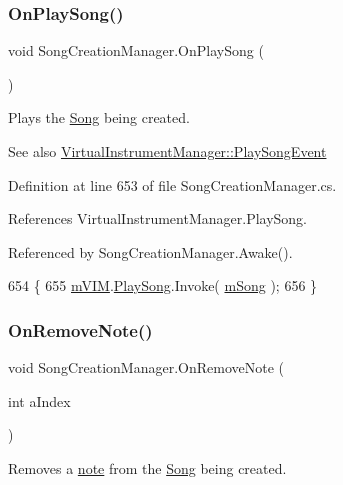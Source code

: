 \subsubsection{\texorpdfstring{On\+Play\+Song()}{OnPlaySong()}}
{\footnotesize\ttfamily void Song\+Creation\+Manager.\+On\+Play\+Song (\begin{DoxyParamCaption}{ }\end{DoxyParamCaption})}



Plays the \hyperlink{class_song}{Song} being created. 

\begin{DoxySeeAlso}{See also}
\hyperlink{group___v_i_m_event_types_class_virtual_instrument_manager_1_1_play_song_event}{Virtual\+Instrument\+Manager\+::\+Play\+Song\+Event} 
\end{DoxySeeAlso}


Definition at line 653 of file Song\+Creation\+Manager.\+cs.



References Virtual\+Instrument\+Manager.\+Play\+Song.



Referenced by Song\+Creation\+Manager.\+Awake().


\begin{DoxyCode}
654     \{
655         \hyperlink{group___s_c_m_priv_var_ga7822ac42d20a4577db66808f000decfb}{mVIM}.\hyperlink{group___v_i_m_events_gae450bdba9c513ab4e43f69def50fa84d}{PlaySong}.Invoke( \hyperlink{group___s_c_m_priv_var_gabd8329149faef65a689650d951a9abc9}{mSong} );
656     \}
\end{DoxyCode}
\mbox{\label{group___s_c_m_handlers_ga1f1e9a15a6c339282fb94085d4862605}} 
\subsubsection{\texorpdfstring{On\+Remove\+Note()}{OnRemoveNote()}}
{\footnotesize\ttfamily void Song\+Creation\+Manager.\+On\+Remove\+Note (\begin{DoxyParamCaption}\item[{int}]{a\+Index }\end{DoxyParamCaption})}



Removes a \hyperlink{group___music_structs_struct_music_1_1_combined_note}{note} from the \hyperlink{class_song}{Song} being created. 


